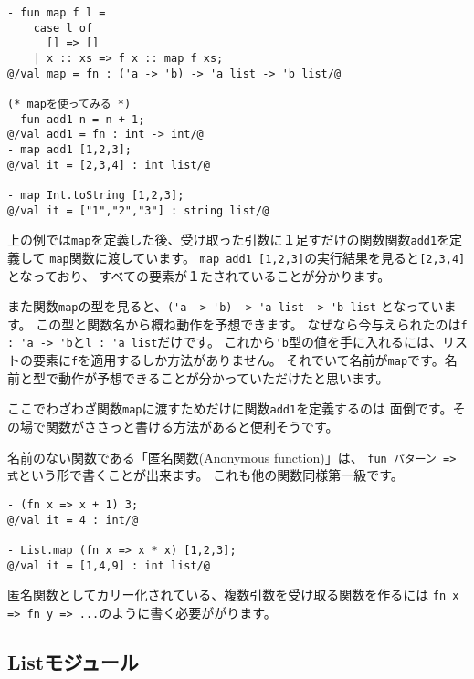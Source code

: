 \documentclass[11pt,a4paper]{article}
\begin{document}
\begin{lstlisting}[caption=関数fとリストlを受け取り、lの要素全てにfを適用する関数, label=code:map]
- fun map f l =
    case l of
      [] => []
    | x :: xs => f x :: map f xs;
@/val map = fn : ('a -> 'b) -> 'a list -> 'b list/@

(* mapを使ってみる *)
- fun add1 n = n + 1;
@/val add1 = fn : int -> int/@
- map add1 [1,2,3];
@/val it = [2,3,4] : int list/@

- map Int.toString [1,2,3];
@/val it = ["1","2","3"] : string list/@
\end{lstlisting}

上の例では\lstinline{map}を定義した後、受け取った引数に１足すだけの関数関数\lstinline{add1}を定義して
\lstinline{map}関数に渡しています。
\lstinline{map add1 [1,2,3]}の実行結果を見ると\lstinline{[2,3,4]}となっており、
すべての要素が１たされていることが分かります。

また関数\lstinline{map}の型を見ると、\lstinline{('a -> 'b) -> 'a list -> 'b list}
となっています。
この型と関数名から概ね動作を予想できます。
なぜなら今与えられたのは\lstinline{f : 'a -> 'b}と\lstinline{l : 'a list}だけです。
これから\lstinline{'b}型の値を手に入れるには、リストの要素に\lstinline{f}を適用するしか方法がありません。
それでいて名前が\lstinline{map}です。名前と型で動作が予想できることが分かっていただけたと思います。

\vspace{0.3cm} %

ここでわざわざ関数\lstinline{map}に渡すためだけに関数\lstinline{add1}を定義するのは
面倒です。その場で関数がささっと書ける方法があると便利そうです。

名前のない関数である「匿名関数(Anonymous function)」は、
\lstinline{fun パターン => 式}という形で書くことが出来ます。
これも他の関数同様第一級です。

\begin{lstlisting}[caption=匿名関数,label=code:anonymous]
- (fn x => x + 1) 3;
@/val it = 4 : int/@

- List.map (fn x => x * x) [1,2,3];
@/val it = [1,4,9] : int list/@
\end{lstlisting}

匿名関数としてカリー化されている、複数引数を受け取る関数を作るには
\lstinline{fn x => fn y => ...}のように書く必要ががります。


\subsection{Listモジュール}
\end{document}
